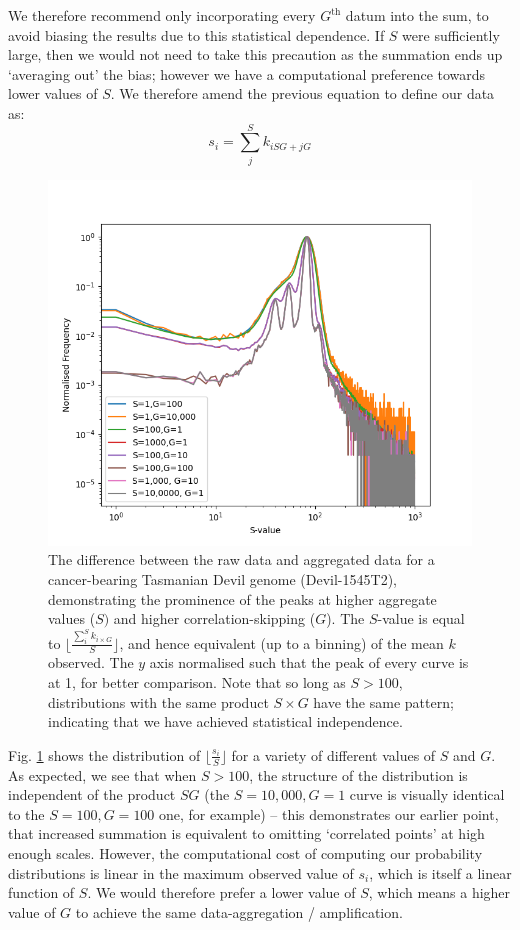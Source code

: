 \documentclass[fleqn,usenatbib]{mnras}
\begin{document}
			We therefore recommend only incorporating every $G^\text{th}$ datum into the sum, to avoid biasing the results due to this statistical dependence. If $S$ were sufficiently large, then we would not need to take this precaution as the summation ends up `averaging out' the bias; however we have a computational preference towards lower values of $S$. We therefore amend the previous equation to define our data as:
			\begin{equation}
				s_i = \sum_j^S k_{iSG + jG}
			\end{equation}
			\begin{figure}
				\includegraphics[width=\linewidth,keepaspectratio=true]{Figures/aggregate.png}
				\caption{The difference between the raw data and aggregated data for a cancer-bearing Tasmanian Devil genome (Devil-1545T2), demonstrating the prominence of the peaks at higher aggregate values ($S)$ and higher correlation-skipping ($G$). The $S$-value is equal to $\lfloor \frac{\sum_{i}^S k_{i\times G}}{S} \rfloor$, and hence equivalent (up to a binning) of the mean $k$ observed. The $y$ axis normalised such that the peak of every curve is at 1, for better comparison. Note that so long as $S > 100$, distributions with the same product $S\times G$ have the same pattern; indicating that we have achieved statistical independence.}\label{F:Aggregation}
			\end{figure}

			Fig. \ref{F:Aggregation} shows the distribution of $\lfloor\frac{s_i}{S}\rfloor$ for a variety of different values of $S$ and $G$. As expected, we see that when $ S> 100$, the structure of the distribution is independent of the product $SG$ (the $S=10,000, G=1$ curve is visually identical to the $S=100, G= 100$ one, for example) -- this demonstrates our earlier point, that increased summation is equivalent to omitting `correlated points' at high enough scales. However, the computational cost of computing our probability distributions is linear in the maximum observed value of $s_i$, which is itself a linear function of $S$. We would therefore prefer a lower value of $S$, which means a higher value of $G$ to achieve the same data-aggregation / amplification.
		
\end{document}
